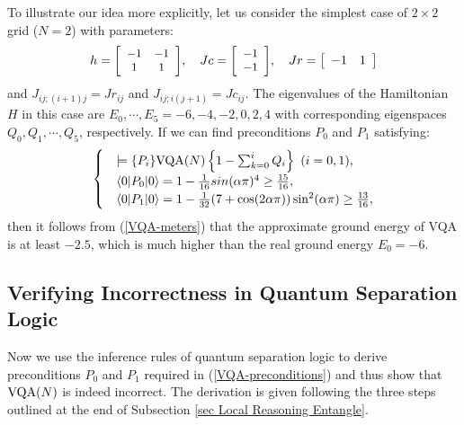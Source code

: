 \documentclass[conference,compsoc, 10pt]{IEEEtran}
\def\>{\ensuremath{\rangle}}
\def\<{\ensuremath{\langle}}
\providecommand{\todo}[1]{{\protect\color{red}\noindent {\bf [todo]}\emph{#1} {\bf [/todo]}}}
\begin{document}
\begin{appendices}
		To illustrate our idea more explicitly, let us consider the simplest case of $2\times 2$ grid ($N = 2$) with parameters:
		$$h = {\small\left[\begin{array}{cc}-1 & -1 \\ 1 & 1\end{array}\right]},\quad Jc = {\small\left[\begin{array}{c}-1 \\ -1\end{array}\right]},\quad Jr = \left[\begin{array}{cc}-1 & 1\end{array}\right]$$
		and $J_{ij;(i+1)j} = Jr_{ij}$ and $J_{ij;i(j+1)} = Jc_{ij}$. 
		The eigenvalues of the Hamiltonian $H$ in this case are $E_0,\cdots,E_5 = -6,-4,-2,0,2,4$ with corresponding eigenspaces $Q_0,Q_1,\cdots,Q_5$, respectively.  If we can find preconditions $P_0$ and $P_1$ satisfying: 
		\begin{equation}\label{VQA-preconditions}\begin{cases}&\models\{P_i\} {\rm VQA}(N) \left\{1-\sum_{k=0}^{i}Q_i\right\}\ (i=0,1),\\ 
		&\<0|P_0|0\> = 1-\frac{1}{16}sin(\alpha\pi)^4 \ge \frac{15}{16}, \\
		&\<0|P_1|0\> = 1-\frac{1}{32}(7+\cos(2\alpha\pi))\sin^2(\alpha\pi)\ge \frac{13}{16},
		\end{cases}\end{equation}
		then it follows from (\ref{VQA-meters}) that the approximate ground energy of VQA is at least $-2.5$, which is much higher than the real ground energy $E_0 = -6$.
		
		\subsection{Verifying Incorrectness in Quantum Separation Logic}
		\label{sec app sub Verifying Incorrectness in QSL}
		Now we use the inference rules of quantum separation logic to derive preconditions $P_0$ and $P_1$ required in (\ref{VQA-preconditions}) and thus show that ${\rm VQA}(N)$ is indeed incorrect. %
		The derivation is given following the three steps outlined at the end of Subsection \ref{sec Local Reasoning Entangle}. 
		

\end{appendices}
\end{document}
